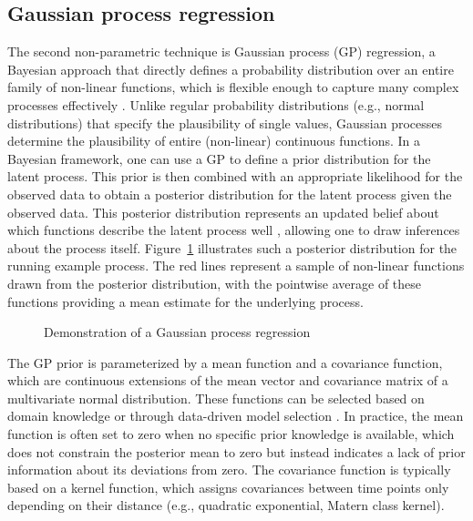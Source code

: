 \documentclass[man, floatsintext]{apa7}
\begin{document}
\subsection{Gaussian process regression}

The second non-parametric technique is Gaussian process (GP) regression, a
Bayesian approach that directly defines a probability distribution over an
entire family of non-linear functions, which is flexible enough to capture
many complex processes effectively \parencite{rasmussen_gaussian_2006,
  betancourt_robust_2020, roberts_gaussian_2013}. Unlike regular probability
distributions (e.g., normal distributions) that specify the plausibility of
single values, Gaussian processes determine the plausibility of entire
(non-linear) continuous functions. In a Bayesian framework, one can use a GP to
define
a prior distribution for the latent process. This prior is then combined
with an appropriate likelihood for the observed data to obtain a posterior
distribution for the latent process given the observed data.
This posterior distribution represents an updated belief about which functions
describe the latent process well
\parencite{kruschke_doing_2011}, allowing one to draw inferences about the
process itself. Figure~\ref{fig:gp_dem} illustrates such a posterior
distribution for the running
example process. The red lines represent a sample of non-linear functions
drawn from the posterior distribution, with the pointwise average of these
functions providing a mean estimate for the underlying process.

\begin{figure}[!ht]
  \caption{Demonstration of a Gaussian process regression}
  \label{fig:gp_dem}
\end{figure}

The GP prior is parameterized by a mean function and a covariance function,
which are continuous extensions of the mean vector and covariance matrix of a
multivariate normal distribution. These functions can be selected based on
domain knowledge or through data-driven model selection
\parencite{richardson_gaussian_2017, abdessalem_automatic_2017}. In practice,
the mean function is often set to zero when no specific prior knowledge is
available, which does not constrain the posterior mean to zero but instead
indicates a lack of prior information about its deviations from zero.
The covariance function is typically based on a kernel function, which assigns
covariances between time points only depending on their distance
(e.g., quadratic exponential, Matern class kernel).
\end{document}
